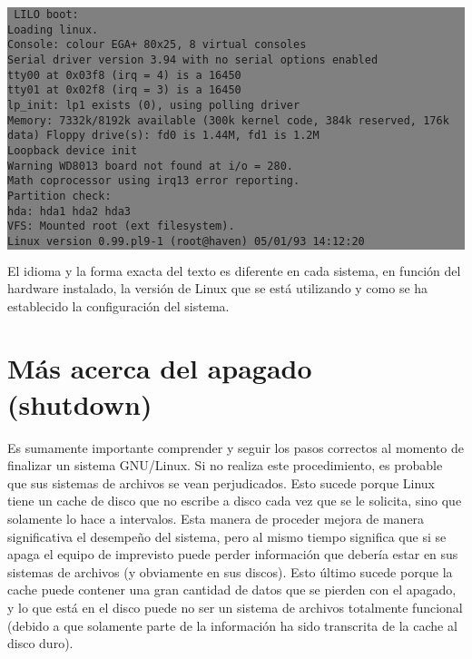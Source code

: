 \documentclass[12pt]{article}
\begin{document}
\colorbox{grey}{\parbox[t]{0.95\linewidth}{ \vspace*{0.5cm} {\tt 
LILO boot: \\
Loading linux. \\
Console: colour EGA+ 80x25, 8 virtual consoles \\
Serial driver version 3.94 with no serial options enabled \\
tty00 at 0x03f8 (irq = 4) is a 16450 \\
tty01 at 0x02f8 (irq = 3) is a 16450 \\
lp\_init: lp1 exists (0), using polling driver \\
Memory: 7332k/8192k available (300k kernel code, 384k reserved, 176k \\
data)
Floppy drive(s): fd0 is 1.44M, fd1 is 1.2M \\
Loopback device init \\
Warning WD8013 board not found at i/o = 280. \\
Math coprocessor using irq13 error reporting. \\
Partition check: \\
  hda: hda1 hda2 hda3 \\
VFS: Mounted root (ext filesystem). \\
Linux version 0.99.pl9-1 (root@haven) 05/01/93 14:12:20
 } \vspace*{0.5cm} } } 


El idioma y la forma exacta del texto es diferente en cada sistema, en función
del hardware instalado, la versión de Linux que se está utilizando y como se ha
establecido la configuración del sistema.



\section{ Más acerca del apagado (shutdown)}

 Es sumamente importante comprender y seguir los pasos correctos al
momento de finalizar un sistema GNU/Linux. Si no realiza este procedimiento, es 
probable que sus sistemas de archivos se vean perjudicados. Esto sucede porque Linux 
tiene un cache de disco que no escribe a disco cada vez que se le solicita, sino 
que solamente lo hace a intervalos. Esta manera de proceder mejora de manera 
significativa el desempeño del sistema, pero al mismo tiempo significa que si se 
apaga el equipo de imprevisto puede perder información que debería estar en 
sus sistemas de archivos (y obviamente en sus discos). Esto último sucede porque la cache puede
contener una gran cantidad de datos que se pierden con el apagado, y lo que está
en el disco puede no ser un sistema de archivos totalmente funcional (debido a
que solamente parte de la información ha sido transcrita de la cache al disco
duro).  
\end{document}
